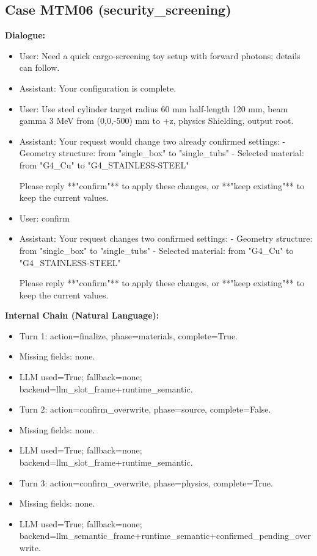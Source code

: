 \documentclass[11pt]{ctexart}
\begin{document}
\subsection{Case MTM06 (security\_screening)}
\textbf{Dialogue:}
\begin{itemize}
\item User: Need a quick cargo-screening toy setup with forward photons; details can follow.
\item Assistant: Your configuration is complete.
\item User: Use steel cylinder target radius 60 mm half-length 120 mm, beam gamma 3 MeV from (0,0,-500) mm to +z, physics Shielding, output root.
\item Assistant: Your request would change two already confirmed settings:
- Geometry structure: from "single\_box" to "single\_tubs"
- Selected material: from "G4\_Cu" to "G4\_STAINLESS-STEEL"

Please reply **"confirm"** to apply these changes, or **"keep existing"** to keep the current values.
\item User: confirm
\item Assistant: Your request changes two confirmed settings:
- Geometry structure: from "single\_box" to "single\_tubs"
- Selected material: from "G4\_Cu" to "G4\_STAINLESS-STEEL"

Please reply **"confirm"** to apply these changes, or **"keep existing"** to keep the current values.
\end{itemize}
\textbf{Internal Chain (Natural Language):}
\begin{itemize}
\item Turn 1: action=finalize, phase=materials, complete=True.
\item Missing fields: none.
\item LLM used=True; fallback=none; backend=llm\_slot\_frame+runtime\_semantic.
\item Turn 2: action=confirm\_overwrite, phase=source, complete=False.
\item Missing fields: none.
\item LLM used=True; fallback=none; backend=llm\_slot\_frame+runtime\_semantic.
\item Turn 3: action=confirm\_overwrite, phase=physics, complete=True.
\item Missing fields: none.
\item LLM used=True; fallback=none; backend=llm\_semantic\_frame+runtime\_semantic+confirmed\_pending\_overwrite.
\end{itemize}
\end{document}
